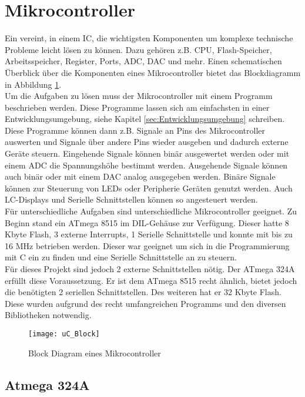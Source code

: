 \section{Mikrocontroller}
Ein  vereint, in einem IC, die wichtigsten Komponenten um komplexe technische Probleme leicht lösen zu können. Dazu gehören z.B. CPU, Flash-Speicher, Arbeitsspeicher, Register, Ports, ADC, DAC und mehr. Einen schematischen Überblick über die Komponenten eines Mikrocontroller bietet das Blockdiagramm in Abbildung \ref{fig:uC_Blockdiagramm}. \\
Um die Aufgaben zu lösen muss der Mikrocontroller mit einem Programm beschrieben werden. Diese Programme lassen sich am einfachsten in einer Entwicklungsumgebung, siehe Kapitel \ref{sec:Entwicklungsumgebung} schreiben. Diese Programme können dann z.B. Signale an Pins des Mikrocontroller auswerten und Signale über andere Pins wieder ausgeben und dadurch externe Geräte steuern. Eingehende Signale können binär ausgewertet werden oder mit einem ADC die Spannungshöhe bestimmt werden. Ausgehende Signale können auch binär oder mit einem DAC analog ausgegeben werden. Binäre Signale können zur Steuerung von LEDs oder Peripherie Geräten genutzt werden. Auch LC-Displays und Serielle Schnittstellen können so angesteuert werden.\\
Für unterschiedliche Aufgaben sind unterschiedliche Mikrocontroller geeignet. Zu Beginn stand ein ATmega 8515\cite{atmel:8515} im DIL-Gehäuse zur Verfügung. Dieser hatte 8 Kbyte Flash, 3 externe Interrupts, 1 Serielle Schnittstelle und konnte mit bis zu 16 MHz betrieben werden. 
Dieser war geeignet um sich in die Programmierung mit C ein zu finden und eine Serielle Schnittstelle an zu steuern. \\
Für dieses Projekt sind jedoch 2 externe Schnittstellen nötig. Der ATmega 324A\cite{atmel:324A} erfüllt diese Voraussetzung. Er ist dem ATmega 8515 recht ähnlich, bietet jedoch die benötigten 2 seriellen Schnittstellen. Des weiteren hat er 32 Kbyte Flash. Diese wurden aufgrund des recht umfangreichen Programms und den diversen Bibliotheken notwendig.
\begin{figure}[htb]
\centering
\texttt{[image: uC\_Block]}
\caption{Block Diagram eines Mikrocontroller}
\label{fig:uC_Blockdiagramm}
\citep{atmel:ug_324A}
\end{figure}
\subsection{Atmega 324A}

